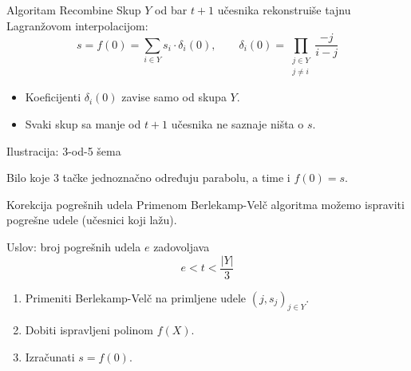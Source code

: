 \documentclass[aspectratio=1610]{beamer}
\begin{document}
\begin{frame}{Algoritam Recombine}
Skup $Y$ od bar $t+1$ učesnika rekonstruiše tajnu Lagranžovom interpolacijom:
\[s = f(0) = \sum_{i \in Y} s_i \cdot \delta_i(0),
\qquad
\delta_i(0) = \prod_{\substack{j \in Y \\ j \neq i}} \frac{-j}{i-j}\]
 
\begin{itemize}
\item Koeficijenti $\delta_i(0)$ zavise samo od skupa $Y$.
\item Svaki skup sa manje od $t+1$ učesnika ne saznaje ništa o $s$.
\end{itemize}
\end{frame}

 
\begin{frame}{Ilustracija: 3-od-5 šema}
\centering
{}
 
\vspace{0.4em}
Bilo koje 3 tačke jednoznačno određuju parabolu, a time i $f(0) = s$.
\end{frame}
 

\begin{frame}{Korekcija pogrešnih udela}
Primenom Berlekamp-Velč algoritma možemo ispraviti pogrešne udele
(učesnici koji lažu).
 
\vspace{0.8em}
Uslov: broj pogrešnih udela $e$ zadovoljava
\[e < t < \frac{|Y|}{3}\]
 
\begin{enumerate}
\item Primeniti Berlekamp-Velč na primljene udele $(j, s_j)_{j \in Y}$.
\item Dobiti ispravljeni polinom $f(X)$.
\item Izračunati $s = f(0)$.
\end{enumerate}
\end{frame}
\end{document}

